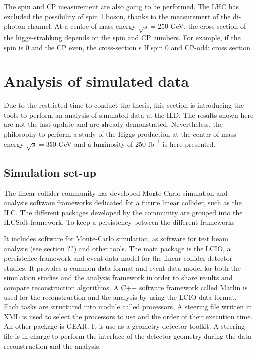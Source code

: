     The spin and CP measurement are also going to be performed. 
    The LHC has excluded the possibility of spin 1 boson, thanks to the measurement of the di-photon channel. 
    At a centre-of-mass energy $\sqrt{s} = 250$ GeV, the cross-section of the higgs-strahlung depends on the spin and CP numbers.
    For example, if the spin is 0 and the CP even, the cross-section s
    If spin 0 and CP-odd: cross section

  \section{Analysis of simulated data}
  
    Due to the restricted time to conduct the thesis, this section is introducing the tools to perform an analysis of simulated data at the ILD. 
    The results shown here are not the last update and are already demonstrated. 
    Nevertheless, the philosophy to perform a study of the Higgs production at the center-of-mass energy $\sqrt{s} = 350$ GeV and a luminosity of 250 $\text{fb}^{-1}$ is here presented.
  
  \subsection{Simulation set-up}  
  \label{subsec:ILCSOFT}
  
    The linear collider community has developed Monte-Carlo simulation and analysis software frameworks dedicated for a future linear collider, such as the \gls{ILC}. 
    The different packages developed by the community are grouped into the ILCSoft framework\cite{ilcsoft}.
    To keep a persistency between the different frameworks
    
    It includes software for Monte-Carlo simulation, as software for test beam analysis (see section ??) and other tools.
    The main package is the \gls{LCIO}, a persistence framework and event data model for the linear collider detector studies\cite{lcio}. 
    It provides a common data format and event data model for both the simulation studies and the analysis framework in order to share results and compare reconstruction algorithms.
    A C++ software framework called \gls{Marlin} is used for the reconstruction and the analysis by using the \gls{LCIO} data format.
    Each tasks are structured into module called processors. 
    A steering file written in XML is used to select the processors to use and the order of their execution time.
    An other package is \gls{GEAR}.
    It is use as a geometry detector toolkit.
    A steering file is in charge to perform the interface of the detector geometry during the data reconstruction and the analysis.

